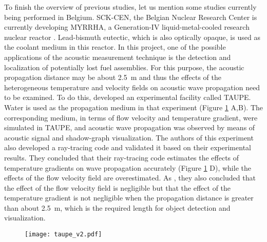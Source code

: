     To finish the overview of previous studies, let us mention some studies currently being performed in Belgium.
    SCK-CEN, the Belgian Nuclear Research Center is currently developing MYRRHA, a Generation-IV liquid-metal-cooled research nuclear reactor
\parencite{AitAbderrahim2012MYRRHAAmulti}. Lead-bismuth eutectic, which is also optically opaque, is used as the coolant medium in this reactor.
    In this project, one of the possible applications of the acoustic measurement technique is the detection and localization of potentially lost fuel assemblies.
For this purpose, the acoustic propagation distance may be about \SI{2.5}{\meter} and thus the effects of the heterogeneous temperature and velocity fields
on acoustic wave propagation need to be examined.
    To do this, \textcite{VandeWyer2014Experimentalandnumerical} developed an experimental facility called TAUPE. Water is used as the propagation
medium in that experiment (Figure \ref{fig:taupe} A,B). The corresponding medium, in terms of flow velocity and temperature gradient, were simulated in TAUPE,
and acoustic wave propagation was observed by means of acoustic signal and shadow-graph visualization.
    The authors of this experiment also developed a ray-tracing code and validated it based on their experimental results.
    They concluded that their ray-tracing code estimates the effects of temperature gradients on wave propagation accurately (Figure \ref{fig:taupe} D),
while the effects of the flow velocity field are overestimated. As \cite{Massacret2012Simplifiedmodelingof}, they also concluded that the effect of the flow velocity field
is negligible but that the effect of the temperature gradient is not negligible when the propagation distance is greater than about \SI{2.5}{\meter},
which is the required length for object detection and visualization.

    \begin{figure}[htbp]
        \centerline{\texttt{[image: taupe\_v2.pdf]}}
        \label{fig:taupe}
    \end{figure}

